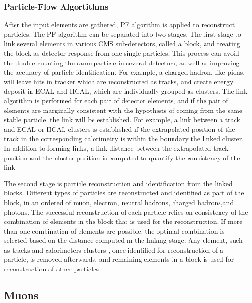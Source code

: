 \subsubsection*{Particle-Flow Algortithms} 
After the input elements are gathered, PF algorithm is applied to reconstruct particles. The PF algorithm can be separated into two stages. The first stage to link several elements in various CMS sub-detectors, called a block, and treating the block as detector response from one single particles. This process can avoid the double counting the same particle in several detectors, as well as improving the accuracy of particle identification. For example, a charged hadron, like pions, will leave hits in tracker which are reconstructed as tracks, and create energy deposit in ECAL and HCAL, which are individually grouped as clusters. The link algorithm is performed for each pair of detector elements, and if the pair of elements are marginally consistent with the hypothesis of coming from the same stable particle, the link will be established. For example, a link between a track and ECAL or HCAL clusters is established if the extrapolated position of the track in the corresponding calorimetry is within the boundary the linked cluster. In addition to forming links, a link distance between the extrapolated track position and the cluster position is computed to quantify the consistency of the link.

The second stage is particle reconstruction and identification from the linked blocks. Different types of particles are reconstructed and identified as part of the block, in an ordered of muon, electron, neutral hadrons, charged hadrons,and photons. The successful reconstruction of each particle relies on consistency of the combination of elements in the block that is used for the reconstruction. If more than one combination of elements are possible, the optimal combination is selected based on the distance computed in the linking stage. Any element, such as tracks and calorimeters clusters , once identified for reconstruction of a particle, is removed afterwards, and remaining elements in a block is used for reconstruction of other particles. 




%

\subsection{Muons}
